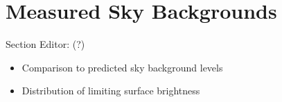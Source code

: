 \section{Measured Sky Backgrounds}
\label{sec:sky_background}

Section Editor: (?)

\begin{itemize}
    \item Comparison to predicted sky background levels
    \item Distribution of limiting surface brightness
\end{itemize}